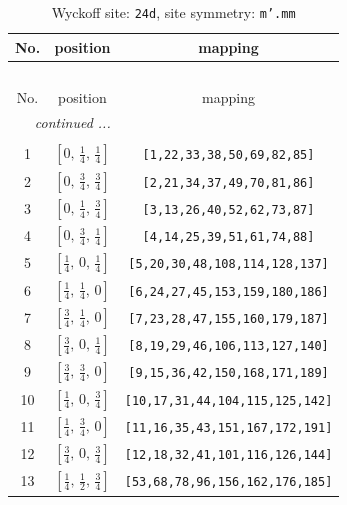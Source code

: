 \documentclass[fleqn,8pt]{jsarticle}
\begin{document}
\begin{longtable}{ccc}
\caption{Wyckoff site: {\tt 24d}, site symmetry: {\tt m'.mm}}
 \\
 \hline \hline
No. & position & mapping \\ \hline \endfirsthead

\multicolumn{2}{l}{\tablename\ \thetable{}} \\
 \hline \hline
No. & position & mapping \\ \hline \endhead

 \hline \hline
\multicolumn{2}{r}{\footnotesize\it continued ...} \\ \endfoot

 \hline \hline
\multicolumn{2}{r}{} \\ \endlastfoot

1 & $\left[ 0,\, \frac{1}{4},\, \frac{1}{4} \right]$ & {\tt [1,22,33,38,50,69,82,85]} \\ \hline
2 & $\left[ 0,\, \frac{3}{4},\, \frac{3}{4} \right]$ & {\tt [2,21,34,37,49,70,81,86]} \\ \hline
3 & $\left[ 0,\, \frac{1}{4},\, \frac{3}{4} \right]$ & {\tt [3,13,26,40,52,62,73,87]} \\ \hline
4 & $\left[ 0,\, \frac{3}{4},\, \frac{1}{4} \right]$ & {\tt [4,14,25,39,51,61,74,88]} \\ \hline
5 & $\left[ \frac{1}{4},\, 0,\, \frac{1}{4} \right]$ & {\tt [5,20,30,48,108,114,128,137]} \\ \hline
6 & $\left[ \frac{1}{4},\, \frac{1}{4},\, 0 \right]$ & {\tt [6,24,27,45,153,159,180,186]} \\ \hline
7 & $\left[ \frac{3}{4},\, \frac{1}{4},\, 0 \right]$ & {\tt [7,23,28,47,155,160,179,187]} \\ \hline
8 & $\left[ \frac{3}{4},\, 0,\, \frac{1}{4} \right]$ & {\tt [8,19,29,46,106,113,127,140]} \\ \hline
9 & $\left[ \frac{3}{4},\, \frac{3}{4},\, 0 \right]$ & {\tt [9,15,36,42,150,168,171,189]} \\ \hline
10 & $\left[ \frac{1}{4},\, 0,\, \frac{3}{4} \right]$ & {\tt [10,17,31,44,104,115,125,142]} \\ \hline
11 & $\left[ \frac{1}{4},\, \frac{3}{4},\, 0 \right]$ & {\tt [11,16,35,43,151,167,172,191]} \\ \hline
12 & $\left[ \frac{3}{4},\, 0,\, \frac{3}{4} \right]$ & {\tt [12,18,32,41,101,116,126,144]} \\ \hline
13 & $\left[ \frac{1}{4},\, \frac{1}{2},\, \frac{3}{4} \right]$ & {\tt [53,68,78,96,156,162,176,185]} \\ \hline

\end{longtable}
\end{document}
